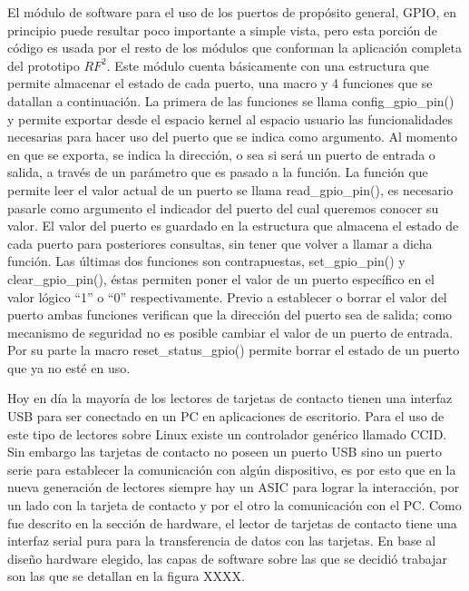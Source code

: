 El módulo de software para el uso de los puertos de propósito general, GPIO, en principio puede resultar poco importante a simple vista, pero esta porción de código es usada por el resto de los módulos que conforman la aplicación completa del prototipo $RF^{2}$. 
Este módulo cuenta básicamente con una estructura que permite almacenar el estado de cada puerto, una macro y 4 funciones que se datallan a continuación.
La primera de las funciones se llama config\_gpio\_pin() y permite exportar desde el espacio kernel al espacio usuario las funcionalidades necesarias para hacer uso del puerto que se indica como argumento. Al momento en que se exporta, se indica la dirección, o sea si será un puerto de entrada o salida, a través de un parámetro que es pasado a la función.
La función que permite leer el valor actual de un puerto se llama read\_gpio\_pin(), es necesario pasarle como argumento el indicador del puerto del cual queremos conocer su valor. El valor del puerto es guardado en la estructura que almacena el estado de cada puerto para posteriores consultas, sin tener que volver a llamar a dicha función.
Las últimas dos funciones son contrapuestas, set\_gpio\_pin() y clear\_gpio\_pin(), éstas permiten poner el valor de un puerto específico en el valor lógico “1” o “0” respectivamente. Previo a establecer o borrar el valor del puerto ambas funciones verifican que la dirección del puerto sea de salida; como mecanismo de seguridad no es posible cambiar el valor de un puerto de entrada.
Por su parte la macro reset\_status\_gpio() permite borrar el estado de un puerto que ya no esté en uso.


\bigskip
{}

Hoy en día la mayoría de los lectores de tarjetas de contacto tienen una interfaz USB para ser conectado en un PC en aplicaciones de escritorio. Para el uso de este tipo de lectores sobre Linux existe un controlador genérico llamado CCID.
Sin embargo las tarjetas de contacto no poseen un puerto USB sino un puerto serie para establecer la comunicación con algún dispositivo, es por esto que en la nueva generación de lectores siempre hay un  ASIC para lograr la interacción, por un lado con la tarjeta de contacto y por el otro la comunicación con el PC.
Como fue descrito en la sección de hardware, el lector de tarjetas de contacto tiene una interfaz serial pura para la transferencia de datos con las tarjetas. En base al diseño hardware elegido, las capas de software sobre las que se decidió trabajar son las que se detallan en la figura XXXX. 

